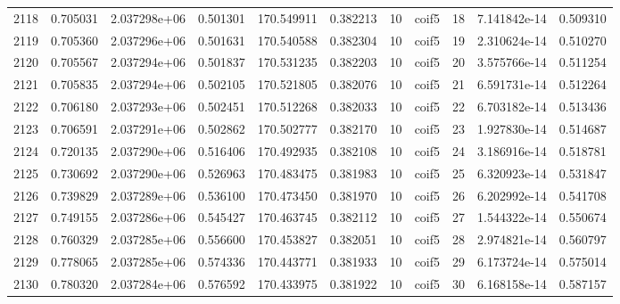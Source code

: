 \begin{tabular}{lrrrrrrlrrr}
2118 &    0.705031 &        2.037298e+06 &  0.501301 &              170.549911 &    0.382213 &      10 &        coif5 &     18 &   7.141842e-14 &      0.509310 \\
2119 &    0.705360 &        2.037296e+06 &  0.501631 &              170.540588 &    0.382304 &      10 &        coif5 &     19 &   2.310624e-14 &      0.510270 \\
2120 &    0.705567 &        2.037294e+06 &  0.501837 &              170.531235 &    0.382203 &      10 &        coif5 &     20 &   3.575766e-14 &      0.511254 \\
2121 &    0.705835 &        2.037294e+06 &  0.502105 &              170.521805 &    0.382076 &      10 &        coif5 &     21 &   6.591731e-14 &      0.512264 \\
2122 &    0.706180 &        2.037293e+06 &  0.502451 &              170.512268 &    0.382033 &      10 &        coif5 &     22 &   6.703182e-14 &      0.513436 \\
2123 &    0.706591 &        2.037291e+06 &  0.502862 &              170.502777 &    0.382170 &      10 &        coif5 &     23 &   1.927830e-14 &      0.514687 \\
2124 &    0.720135 &        2.037290e+06 &  0.516406 &              170.492935 &    0.382108 &      10 &        coif5 &     24 &   3.186916e-14 &      0.518781 \\
2125 &    0.730692 &        2.037290e+06 &  0.526963 &              170.483475 &    0.381983 &      10 &        coif5 &     25 &   6.320923e-14 &      0.531847 \\
2126 &    0.739829 &        2.037289e+06 &  0.536100 &              170.473450 &    0.381970 &      10 &        coif5 &     26 &   6.202992e-14 &      0.541708 \\
2127 &    0.749155 &        2.037286e+06 &  0.545427 &              170.463745 &    0.382112 &      10 &        coif5 &     27 &   1.544322e-14 &      0.550674 \\
2128 &    0.760329 &        2.037285e+06 &  0.556600 &              170.453827 &    0.382051 &      10 &        coif5 &     28 &   2.974821e-14 &      0.560797 \\
2129 &    0.778065 &        2.037285e+06 &  0.574336 &              170.443771 &    0.381933 &      10 &        coif5 &     29 &   6.173724e-14 &      0.575014 \\
2130 &    0.780320 &        2.037284e+06 &  0.576592 &              170.433975 &    0.381922 &      10 &        coif5 &     30 &   6.168158e-14 &      0.587157 \\

\end{tabular}
